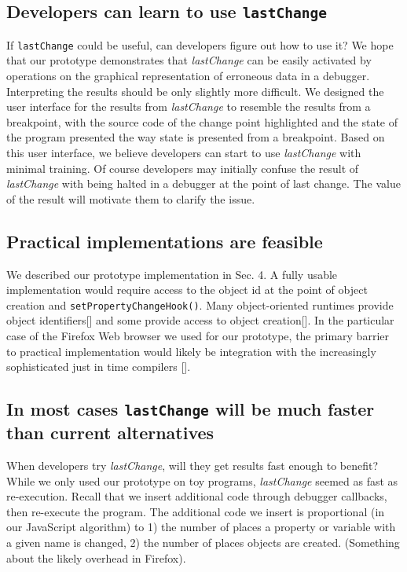 \documentclass[preprint]{sigplanconf}
\begin{document}
\subsection{Developers can learn to use \protect\texttt{lastChange}}

If \texttt{lastChange} could be useful, can developers figure out how
to use it? We hope that our prototype demonstrates that
\textit{lastChange} can be easily activated by operations on the
graphical representation of erroneous data in a debugger. Interpreting
the results should be only slightly more difficult. We designed the
user interface for the results from \textit{lastChange} to resemble
the results from a breakpoint, with the source code of the change
point highlighted and the state of the program presented the way state
is presented from a breakpoint. Based on this user interface, we
believe developers can start to use \textit{lastChange} with minimal
training. Of course developers may initially confuse the result of
\textit{lastChange} with being halted in a debugger at the point of
last change. The value of the result will motivate them to clarify the
issue.

\subsection{Practical implementations are feasible}

We described our prototype implementation in Sec. 4. A fully usable
implementation would require access to the object id at the point of
object creation and \texttt{setPropertyChangeHook()}. Many
object-oriented runtimes provide object identifiers[] and some
provide access to object creation[]. In the particular case of
the Firefox Web browser we used for our prototype, the primary barrier
to practical implementation would likely be integration with the
increasingly sophisticated just in time compilers []. 

\subsection{In most cases \protect\texttt{lastChange} will be much faster than current alternatives}

When developers try \textit{lastChange}, will they get results fast
enough to benefit? While we only used our prototype on toy programs,
\textit{lastChange} seemed as fast as re-execution.  Recall that we
insert additional code through debugger callbacks, then re-execute the
program. The additional code we insert is proportional (in our
JavaScript algorithm) to 1) the number of places a property or
variable with a given name is changed, 2) the number of places objects
are created. (Something about the likely overhead in Firefox).
\end{document}
